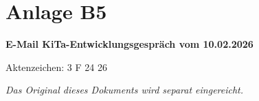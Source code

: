 \documentclass[
  11pt,
  a4paper,
]{article}
\begin{document}

\section{Anlage B5}\label{anlage-b5}

\vspace{3cm}

\textbf{E-Mail KiTa-Entwicklungsgespräch vom 10.02.2026}

Aktenzeichen: 3 F 24 26

\vspace{2cm}

\emph{Das Original dieses Dokuments wird separat eingereicht.}
\end{document}
